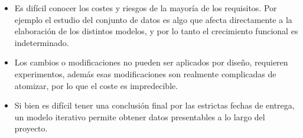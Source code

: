 \documentclass[11pt,a4paper,spanish]{book}
\begin{document}
		\begin{itemize}
			\item Es difícil conocer los costes y riesgos de la mayoría de los requisitos. Por ejemplo el estudio del conjunto de datos es algo que afecta directamente a la elaboración de los distintos modelos, y por lo tanto el crecimiento funcional es indeterminado.  
			
			\item Los cambios o modificaciones no pueden ser aplicados por diseño, requieren experimentos, además esas modificaciones son realmente complicadas de atomizar, por lo que el coste es impredecible. 
			
			\item Si bien es difícil tener una conclusión final por las estrictas fechas de entrega, un modelo iterativo permite obtener datos presentables a lo largo del proyecto.
		\end{itemize}
	
	
	
	\begin{comment}
	Metodologia:
	https://assaf-pinhasi.medium.com/towards-a-development-methodology-for-machine-learning-part-i-f1050a0bc607
	\end{comment}
		
	
\end{document}
